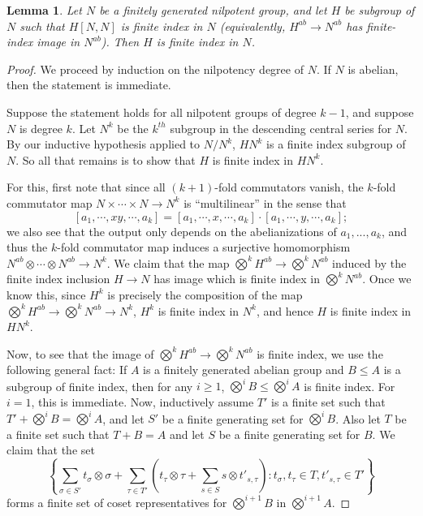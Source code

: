 \documentclass[12pt,reqno]{article}
\numberwithin{equation}{section}
\newtheorem{lemma}{Lemma}
\begin{document}
\begin{lemma} 
Let $N$ be a finitely generated nilpotent group, and let $H$ be subgroup of $N$ such that $H[N,N]$ is finite index in $N$ (equivalently,
$H^{ab} \to N^{ab}$ has finite-index image in $N^{ab}$).
Then $H$ is finite index in $N$.
\end{lemma}
\begin{proof}
We proceed by induction on the nilpotency degree of $N$. If $N$ is abelian, then the statement is immediate.

Suppose the statement holds for all nilpotent groups of degree $k-1$, and suppose $N$ is degree $k$. Let $N^k$ be the $k^{th}$ subgroup
in the descending central series for $N$. By our inductive hypothesis applied to $N/N^k$, $HN^k$ is a finite index subgroup of $N$.
So all that remains is to show that $H$ is finite index in $HN^k$.

For this, first note that since all $(k+1)$-fold commutators vanish, the $k$-fold commutator map $N \times \cdots \times N \to N^k$ is ``multilinear''
in the sense that
\[ [a_1,\cdots,xy,\cdots,a_k] 
= [a_1,\cdots,x,\cdots,a_k]\cdot [a_1,\cdots,y,\cdots,a_k]; \]
we also see that the output only depends on the abelianizations of $a_1,...,a_k$, and thus the $k$-fold commutator map induces a
surjective homomorphism $N^{ab} \otimes \cdots \otimes N^{ab} \to N^k$. We claim that the map $\bigotimes^k H^{ab} \to \bigotimes^k N^{ab}$
induced by the finite index inclusion $H \to N$ has image which is finite index in $\bigotimes^k N^{ab}$. Once we know this,
since $H^k$ is precisely the composition of the map $\bigotimes^k H^{ab} \to \bigotimes^k N^{ab} \to N^k$, $H^k$ is finite index in
$N^k$, and hence $H$ is finite index in $HN^k$.

Now, to see that the image of $\bigotimes^k H^{ab} \to \bigotimes^k N^{ab}$ is finite index, we use the following general fact: If $A$ is
a finitely generated abelian group and $B \le A$ is a subgroup of finite index, then for any $i \ge 1$, $\bigotimes^i B \le \bigotimes^i A$
is finite index. For $i=1$, this is immediate. Now, inductively assume $T'$ is a finite set such that $T' + \bigotimes^i B = \bigotimes^i A$, and let $S'$ be a finite generating set for
$\bigotimes^i B$. Also let $T$ be a finite set such that $T + B = A$ and let $S$ be a finite generating set for $B$.
We claim that the set
\[
   \left\{ \sum_{\sigma \in S'} t_{\sigma} \otimes \sigma 
   + \sum_{\tau \in T'}\left( t_{\tau} \otimes \tau + \sum_{s \in S}  s \otimes t'_{s,\tau} \right) :
   t_{\sigma}, t_{\tau} \in T, t'_{s,\tau} \in T' \right\}
\]
forms a finite set of coset representatives for $\bigotimes^{i+1} B$ in $\bigotimes^{i+1} A$.


\end{proof}
\end{document}

